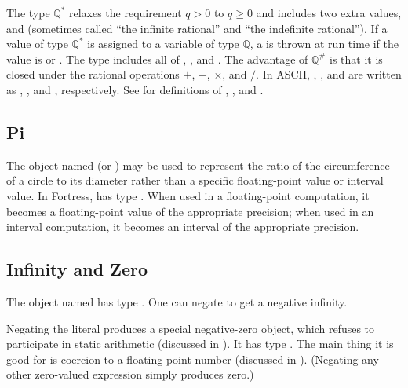 The type $\mathbb{Q}^*$ relaxes the requirement $q>0$ to $q \geq 0$ and
includes two extra values,  and  (sometimes called ``the
infinite rational'' and ``the indefinite rational'').
If a value of type $\mathbb{Q}^*$ is assigned to a
variable of type $\mathbb{Q}$, a  is thrown
at run time if the value is  or .
The type  includes all of , , and
.
The advantage of $\mathbb{Q}^{\#}$ is that it is closed under the rational
operations $+$, $-$, $\times$, and $/$.
In ASCII, , , and
 are written as , , and
, respectively.
See  for definitions of , ,
and .



\subsection{Pi}

The object named \EXP{\pi} (or ) may be used to represent the ratio
of the circumference of a circle to its diameter rather than a specific
floating-point value or interval value.
In Fortress, \EXP{\pi} has type
.
When used in a floating-point computation, it becomes
a floating-point value of the appropriate precision; when used in an interval
computation, it becomes an interval of the appropriate precision.

\subsection{Infinity and Zero}

The object named \EXP{\infty} has type .
One can negate \EXP{\infty} to get a negative infinity.

Negating the literal  produces a special negative-zero object,
which refuses to participate in static arithmetic
(discussed in ).  It
has type .  The main thing it is good for is coercion to
a floating-point number (discussed in
).
(Negating any other zero-valued expression simply produces zero.)
